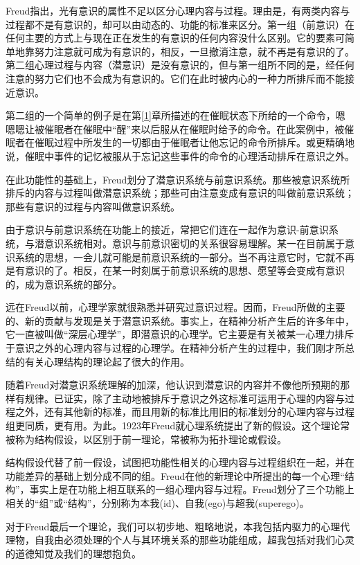 \documentclass[UTF8,10pt,a4paper,openany]{book}
\begin{document}
Freud指出，光有意识的属性不足以区分心理内容与过程。理由是，有两类内容与过程都不是有意识的，却可以由动态的、功能的标准来区分。第一组（前意识）在任何主要的方式上与现在正在发生的有意识的任何内容没什么区别。它的要素可简单地靠努力注意就可成为有意识的，相反，一旦撤消注意，就不再是有意识的了。第二组心理过程与内容（潜意识）是没有意识的，但与第一组所不同的是，经任何注意的努力它们也不会成为有意识的。它们在此时被内心的一种力所排斥而不能接近意识。

第二组的一个简单的例子是在第\ref{1}章所描述的在催眠状态下所给的一个命令，嗯嗯嗯让被催眠者在催眠中“醒”来以后服从在催眠时给予的命令。在此案例中，被催眠者在催眠过程中所发生的一切都由于催眠者让他忘记的命令所排斥。或更精确地说，催眠中事件的记忆被服从于忘记这些事件的命令的心理活动排斥在意识之外。

在此功能性的基础上，Freud划分了潜意识系统与前意识系统。那些被意识系统所排斥的内容与过程叫做潜意识系统；那些可由注意变成有意识的叫做前意识系统；那些有意识的过程与内容叫做意识系统。

由于意识与前意识系统在功能上的接近，常把它们连在一起作为意识-前意识系统，与潜意识系统相对。意识与前意识密切的关系很容易理解。某一在目前属于意识系统的思想，一会儿就可能是前意识系统的一部分。当不再注意它时，它就不再是有意识的了。相反，在某一时刻属于前意识系统的思想、愿望等会变成有意识的，成为意识系统的部分。

远在Freud以前，心理学家就很熟悉并研究过意识过程。因而，Freud所做的主要的、新的贡献与发现是关于潜意识系统。事实上，在精神分析产生后的许多年中，它一直被叫做“深层心理学”，即潜意识的心理学。它主要是有关被某一心理力排斥于意识之外的心理内容与过程的心理学。在精神分析产生的过程中，我们刚才所总结的有关心理结构的理论起了很大的作用。

随着Freud对潜意识系统理解的加深，他认识到潜意识的内容并不像他所预期的那样有规律。已证实，除了主动地被排斥于意识之外这标准可运用于心理的内容与过程之外，还有其他新的标准，而且用新的标准比用旧的标准划分的心理内容与过程组更同质，更有用。为此。1923年Freud就心理系统提出了新的假设。这个理论常被称为结构假设，以区别于前一理论，常被称为拓扑理论或假设。

结构假设代替了前一假设，试图把功能性相关的心理内容与过程组织在一起，并在功能差异的基础上划分成不同的组。Freud在他的新理论中所提出的每一个心理“结构”，事实上是在功能上相互联系的一组心理内容与过程。Freud划分了三个功能上相关的“组”或“结构”，分别称为本我(id)、自我(ego)与超我(superego)。

对于Freud最后一个理论，我们可以初步地、粗略地说，本我包括内驱力的心理代理物，自我由必须处理的个人与其环境关系的那些功能组成，超我包括对我们心灵的道德知觉及我们的理想抱负。
\end{document}
